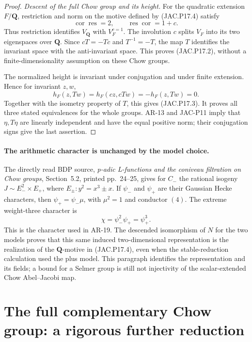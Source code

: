 \documentclass[11pt,a4paper]{article}
\begin{document}
\begin{proof}
\emph{Descent of the full Chow group and its height.}
For the quadratic extension $F/\mathbf Q$, restriction and
norm on the motive defined by (JAC.P17.4) satisfy
\[
 \operatorname{cor}\operatorname{res}=2,
 \qquad \operatorname{res}\operatorname{cor}=1+c.
                                                               \tag{JAC.P17.8}
\]
Thus restriction identifies $V_{\mathbf Q}$ with $V_F^{c=1}$.
The involution $c$ splits $V_F$ into its two eigenspaces over
$\mathbf Q$. Since $cT=-Tc$ and $T^{-1}=-T$, the map $T$
identifies the invariant space with the anti-invariant space.
This proves (JAC.P17.2), without a finite-dimensionality
assumption on these Chow groups.

The normalized height is invariant under conjugation and under
finite extension. Hence for invariant $z,w$,
\[
 h_F(z,Tw)=h_F(cz,cTw)=-h_F(z,Tw)=0.
\]
Together with the isometry property of $T$, this gives
(JAC.P17.3). It proves all three stated equivalences for the
whole groups. AR-13 and JAC-P11 imply that $\eta,T\eta$ are
linearly independent and have the equal positive norm; their
conjugation signs give the last assertion.
\end{proof}

\paragraph{The arithmetic character is unchanged by the model choice.}
The directly read BDP source, \emph{p-adic L-functions and the
coniveau filtration on Chow groups}, Section~5.2, printed
pp.~24--25, gives for $C_-$ the rational isogeny
$J\sim E_-^2\times E_+$, where $E_\pm:y^2=x^3\pm x$.
If $\psi_-$ and $\psi_+$ are their Gaussian Hecke characters,
then $\psi_+=\psi_-\mu$, with $\mu^2=1$ and conductor $(4)$.
The extreme weight-three character is
\[
                \chi=\psi_-^2\psi_+=\psi_+^3.
                                                               \tag{JAC.P17.9}
\]
This is the character used in AR-19. The descended isomorphism
of $N$ for the two models proves that this same induced
two-dimensional representation is the realization of the
$\mathbf Q$-motive in (JAC.P17.4), even when the stable-reduction
calculation used the plus model. This paragraph identifies the
representation and its fields; a bound for a Selmer group is
still not injectivity of the scalar-extended Chow Abel--Jacobi map.

\section{The full complementary Chow group: a rigorous further
reduction}\label{the-full-complementary-chow-group-a-rigorous-further-reduction}
\end{document}
